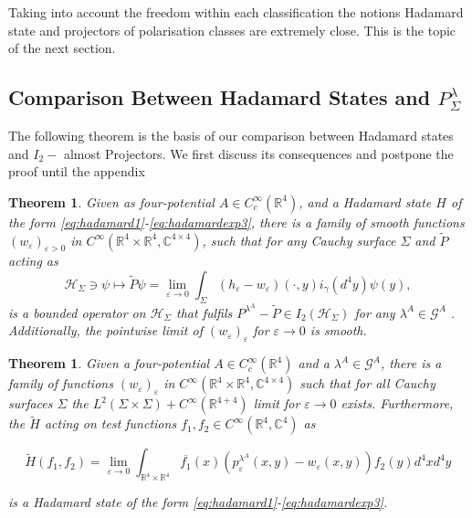 \documentclass[b5paper,draft,openbib,12pt]{memoir}
\newtheorem{Thm}[Def]{Theorem}
\begin{document}
Taking into account the freedom within each classification the notions Hadamard state and  projectors of polarisation classes are extremely close. 
This is the topic of the next section.


\subsection{Comparison Between Hadamard States and \(P^\lambda_\Sigma\)}\label{sec:comparison hadamard pol}

The following theorem is the basis of our comparison between Hadamard states and \(I_2-\) almost Projectors. We first
discuss its consequences and postpone the proof until the appendix 


\begin{Thm}\label{thm:hadamard=>Pol}
Given as four-potential \(A\in C_c^\infty (\mathbb{R}^4)\), and a Hadamard state \(H\) of the form 
\eqref{eq:hadamard1}-\eqref{eq:hadamardexp3}, there is a family of smooth functions 
\((w_\varepsilon)_{\varepsilon>0}\) in \( C^\infty(\mathbb{R}^4\times \mathbb{R}^4,\mathbb{C}^{4\times 4})\), such that for any Cauchy surface 
\(\Sigma\) and \(\tilde{P}\) acting as
\begin{equation}
\mathcal{H}_{\Sigma} \ni \psi \mapsto \tilde{P}\psi= \lim_{\varepsilon \rightarrow 0} \int_{\Sigma} (h_\varepsilon - w_\varepsilon)(\cdot,y)i_{\gamma}(d^4y) \psi(y),
\end{equation}
is a bounded operator on \(\mathcal{H}_\Sigma\) that fulfils \(P^{\lambda^A}-\tilde{P}\in I_2(\mathcal{H}_\Sigma)\) for any \(\lambda^A\in \mathcal{G}^A\) . 
Additionally, the pointwise limit of \((w_\varepsilon)_{\varepsilon}\) for \(\varepsilon \rightarrow 0\) is smooth.
\end{Thm}

\begin{Thm}\label{thm:Pol=>hadamard}
Given a four-potential \(A\in C_c^\infty (\mathbb{R}^4)\) and a \(\lambda^A\in\mathcal{G}^A\), there is a family of functions
\((w_\varepsilon)_\varepsilon\) in \( C^\infty(\mathbb{R}^4 \times \mathbb{R}^4 ,\mathbb{C}^{4\times 4})\) such that for all Cauchy surfaces \(\Sigma\)
the \(L^2(\Sigma\times\Sigma)+C^\infty(\mathbb{R}^{4+4})\) %
limit for \(\varepsilon \rightarrow0\) exists. 
Furthermore, the \(\tilde{H}\) acting on test functions \(f_1,f_2\in C^\infty(\mathbb{R}^{4}, \mathbb{C}^4)\) as

\begin{equation}
\tilde{H}(f_1,f_2)=\lim_{\varepsilon \rightarrow 0} \int_{\mathbb{R}^{4}\times\mathbb{R}^4} \overline{f_1}(x)
\left(p_\varepsilon^{\lambda^A}(x,y)-w_\varepsilon(x,y)\right)f_2(y) d^4x d^4y
\end{equation}

is a Hadamard state of the form \eqref{eq:hadamard1}-\eqref{eq:hadamardexp3}.
\end{Thm}
\end{document}

